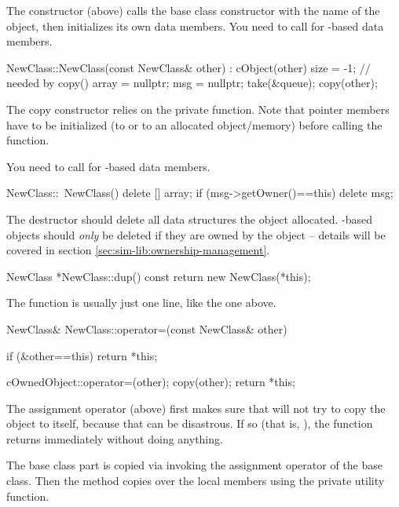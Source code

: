 The constructor (above) calls the base class constructor with
the name of the object, then initializes its own data members.
You need to call  for -based data members.

\begin{cpp}
NewClass::NewClass(const NewClass& other) : cObject(other)
{
    size = -1; // needed by copy()
    array = nullptr;
    msg = nullptr;
    take(&queue);
    copy(other);
}
\end{cpp}

The copy constructor relies on the private  function.
Note that pointer members have to be initialized (to  or to an
allocated object/memory) before calling the  function.

You need to call  for -based data members.

\begin{cpp}
NewClass::~NewClass()
{
    delete [] array;
    if (msg->getOwner()==this)
        delete msg;
}
\end{cpp}

The destructor should delete all data structures the object allocated.
-based objects should \textit{only} be deleted if they
are owned by the object -- details will be covered in section
\ref{sec:sim-lib:ownership-management}.

\begin{cpp}
NewClass *NewClass::dup() const
{
    return new NewClass(*this);
}
\end{cpp}

The  function  is usually just one line, like the one above.

\begin{cpp}
NewClass& NewClass::operator=(const NewClass& other)
{
    if (&other==this)
        return *this;

    cOwnedObject::operator=(other);
    copy(other);
    return *this;
}
\end{cpp}

The assignment operator (above) first makes sure that will not try to copy
the object to itself, because that can be disastrous. If so (that is,
), the function returns immediately without doing anything.

The base class part is copied via invoking the assignment operator of
the base class. Then the method copies over the local members using the
 private utility function.

